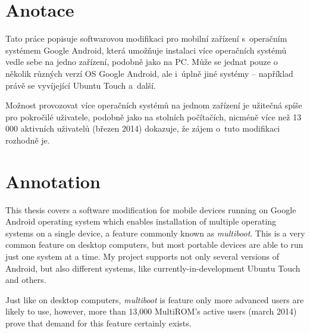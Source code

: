 \documentclass[12pt, a4paper, oneside]{article}
\newcommand{\It}{\textit}  %
\begin{document}
\section*{Anotace}
Tato práce popisuje softwarovou modifikaci pro mobilní zařízení s~operačním systémem Google Android, která umožňuje instalaci více operačních systémů vedle sebe na jedno zařízení, podobně jako na PC. Může se jednat pouze o několik různých verzí OS Google Android, ale i~úplně jiné systémy -- například právě se vyvíjející Ubuntu Touch a~další.

Možnost provozovat více operačních systémů na jednom zařízení je užitečná spíše pro pokročilé uživatele, podobně jako na stolních počítačích, nicméně více než 13 000 aktivních uživatelů (březen 2014) dokazuje, že zájem o~tuto modifikaci rozhodně je.

\section*{Annotation}
This thesis covers a software modification for mobile devices running on Google Android operating system which enables installation of multiple operating systems on a single device, a feature commonly known as \It{multiboot}. This is a very common feature on desktop computers, but most portable devices are able to run just one system at a time. My project supports not only several versions of Android, but also different systems, like currently-in-development Ubuntu Touch and others.

Just like on desktop computers, \It{multiboot} is feature only more advanced users are likely to use, however, more than 13,000 MultiROM's active users (march 2014) prove that demand for this feature certainly exists.

\addtolength{\textheight}{30mm} %

\newpage
\pagestyle{plain}

\setlength{\voffset}{-20mm} %
\setcounter{page}{1}  %

\tableofcontents  %

\addtolength{\textheight}{-30mm} %
\newpage
\setlength{\voffset}{0mm} %
\pagestyle{plain}
\end{document}
